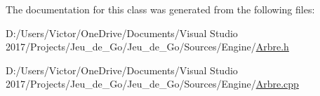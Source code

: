 The documentation for this class was generated from the following files\+:\begin{DoxyCompactItemize}
\item 
D\+:/\+Users/\+Victor/\+One\+Drive/\+Documents/\+Visual Studio 2017/\+Projects/\+Jeu\+\_\+de\+\_\+\+Go/\+Jeu\+\_\+de\+\_\+\+Go/\+Sources/\+Engine/\hyperlink{_arbre_8h}{Arbre.\+h}\item 
D\+:/\+Users/\+Victor/\+One\+Drive/\+Documents/\+Visual Studio 2017/\+Projects/\+Jeu\+\_\+de\+\_\+\+Go/\+Jeu\+\_\+de\+\_\+\+Go/\+Sources/\+Engine/\hyperlink{_arbre_8cpp}{Arbre.\+cpp}\end{DoxyCompactItemize}

